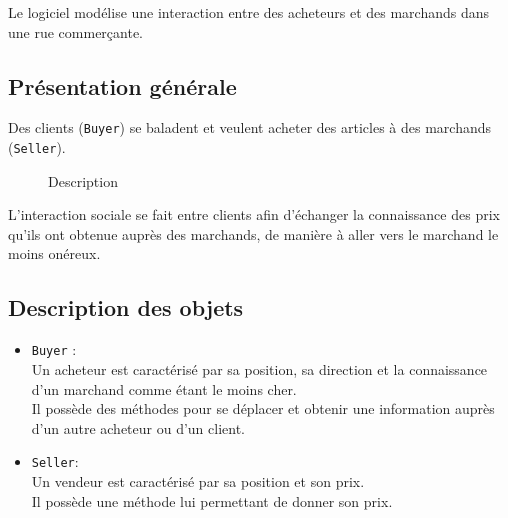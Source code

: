 

Le logiciel modélise une interaction entre des acheteurs et des marchands dans une rue commerçante.

\subsection{Présentation générale}

Des clients (\texttt{Buyer}) se baladent et veulent acheter des articles à des marchands (\texttt{Seller}).

\vspace{1cm}
\begin{figure}[h]
    \centering
    \caption{\label{systeme}Description}
\end{figure}

L'interaction sociale se fait entre clients afin d'échanger la connaissance des prix qu'ils ont obtenue auprès des marchands, de manière à aller vers le marchand le moins onéreux.


\subsection{Description des objets}

\begin{itemize}
\item
	\texttt{Buyer} :\\
	Un acheteur est caractérisé par sa position, sa direction
	et la connaissance d'un marchand comme étant le moins cher.\\
	Il possède des méthodes pour se déplacer et obtenir une information auprès d'un autre acheteur ou d'un client.
	
\item
	\texttt{Seller}:\\
	Un vendeur est caractérisé par sa position et son prix.\\
	Il possède une méthode lui permettant de donner son prix.
	
\end{itemize}


